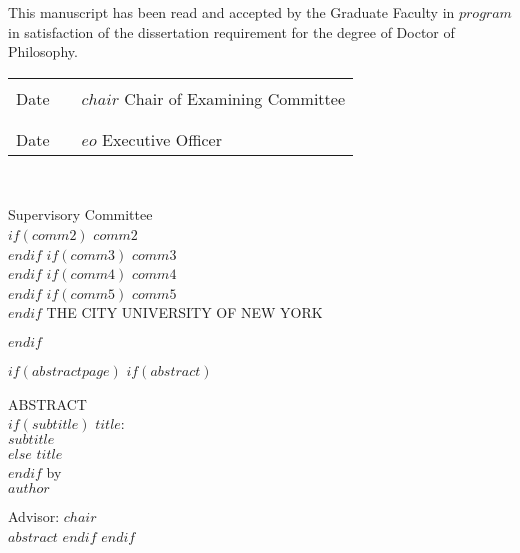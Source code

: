 \documentclass[$if(draft)$$draft$,$endif$$if(fontsize)$$fontsize$,$endif$$if(lang)$$babel-lang$,$endif$$if(papersize)$$papersize$,$endif$$if(sides)$$sides$,$endif$$for(classoption)$$classoption$$sep$,$endfor$]{$documentclass$}
\begin{document}
\begin{changemargin}{0.5in}{0.5in}
\singlespacing
\raggedright
This manuscript has been read and accepted by the Graduate Faculty in $program$ in satisfaction of the dissertation requirement for the degree of Doctor of Philosophy.
\end{changemargin}

\vspace{0.75in}

\setlength{\tabcolsep}{0pt}
\hspace*{-0.5in}
\doublespacing
\begin{tabular}[t]{p{1.75in}p{1.0in}p{3.5in}}
\hrulefill& &\hrulefill \\
Date & & $chair$ \newline Chair of Examining Committee\\
\\
\hrulefill& &\hrulefill \\
Date & & $eo$ \newline Executive Officer\\
\end{tabular}\\[0.5in]

\begin{center}
\doublespacing
Supervisory Committee \\
$if(comm2)$
  $comm2$ \\
$endif$
$if(comm3)$
  $comm3$ \\
$endif$
$if(comm4)$
  $comm4$ \\
$endif$
$if(comm5)$
  $comm5$ \\
$endif$
\vspace{\fill}
\uppercase{The City University of New York}
\end{center}
$endif$

$if(abstractpage)$
$if(abstract)$
\clearpage{}
{}
\label{chap:abstract}
\begin{center}%
  \singlespacing
  ABSTRACT \\[2em]
  $if(subtitle)$
  $title$:\\
  $subtitle$\\[1em]
  $else$
  $title$\\[1em]
  $endif$
  by \\[1em]
  $author$ \\[0.25in]
\end{center}
\vspace{0.25in}
\noindent Advisor: $chair$\\[1em]
\vspace{0.25in}
$abstract$
$endif$
$endif$
\end{document}
